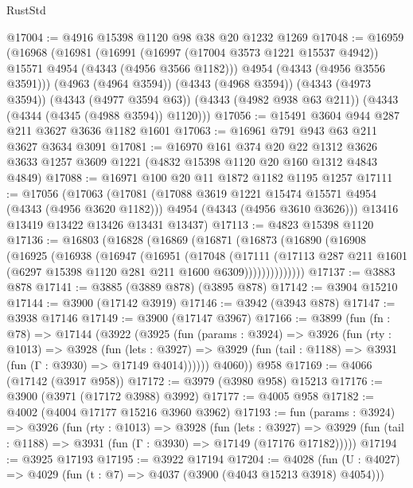 \begin{lexlean}{RustStd}
\begin{coremodule}
@17004 := @4916 @15398 @1120 @98 @38 @20 @1232 @1269
@17048 := @16959
    (@16968
      (@16981
        (@16991 (@16997 (@17004 @3573 @1221 @15537 @4942)) @15571 @4954 (@4343 (@4956 @3566 @1182)))
        @4954
        (@4343 (@4956 @3556 @3591)))
      (@4963 (@4964 @3594))
      (@4343 (@4968 @3594))
      (@4343 (@4973 @3594))
      (@4343 (@4977 @3594 @63))
      (@4343 (@4982 @938 @63 @211))
      (@4343 (@4344 (@4345 (@4988 @3594)) @1120)))
@17056 := @15491 @3604 @944 @287 @211 @3627 @3636 @1182 @1601
@17063 := @16961 @791 @943 @63 @211 @3627 @3634 @3091
@17081 := @16970
    @161
    @374
    @20
    @22
    @1312
    @3626
    @3633
    @1257
    @3609
    @1221
    (@4832 @15398 @1120 @20 @160 @1312 @4843 @4849)
@17088 := @16971 @100 @20 @11 @1872 @1182 @1195 @1257
@17111 := @17056
    (@17063
      (@17081
        (@17088 @3619 @1221 @15474 @15571 @4954 (@4343 (@4956 @3620 @1182)))
        @4954
        (@4343 (@4956 @3610 @3626)))
      @13416
      @13419
      @13422
      @13426
      @13431
      @13437)
@17113 := @4823 @15398 @1120
@17136 := @16803
    (@16828
      (@16869
        (@16871
          (@16873
            (@16890
              (@16908
                (@16925
                  (@16938
                    (@16947
                      (@16951
                        (@17048
                          (@17111
                            (@17113
                              @287
                              @211
                              @1601
                              (@6297 @15398 @1120 @281 @211 @1600 @6309))))))))))))))
@17137 := @3883 @878
@17141 := @3885 (@3889 @878) (@3895 @878)
@17142 := @3904 @15210
@17144 := @3900 (@17142 @3919)
@17146 := @3942 (@3943 @878)
@17147 := @3938 @17146
@17149 := @3900 (@17147 @3967)
@17166 := @3899
    (fun (fn : @78) =>
    @17144
      (@3922
        (@3925
          (fun (params : @3924) =>
          @3926
            (fun (rty : @1013) =>
            @3928
              (fun (lets : @3927) =>
              @3929 (fun (tail : @1188) => @3931 (fun (Γ : @3930) => @17149 @4014))))))
        @4060))
    @958
@17169 := @4066 (@17142 (@3917 @958))
@17172 := @3979 (@3980 @958) @15213
@17176 := @3900 (@3971 (@17172 @3988) @3992)
@17177 := @4005 @958
@17182 := @4002 (@4004 @17177 @15216 @3960 @3962)
@17193 := fun (params : @3924) =>
  @3926
    (fun (rty : @1013) =>
    @3928
      (fun (lets : @3927) =>
      @3929 (fun (tail : @1188) => @3931 (fun (Γ : @3930) => @17149 (@17176 @17182)))))
@17194 := @3925 @17193
@17195 := @3922 @17194
@17204 := @4028
    (fun (U : @4027) => @4029 (fun (t : @7) => @4037 (@3900 (@4043 @15213 @3918) @4054)))

\end{coremodule}
\end{lexlean}
